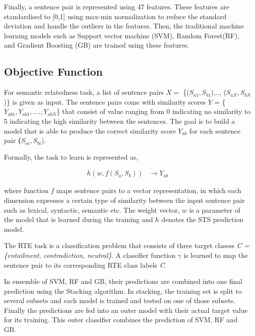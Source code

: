 \documentclass[12pt]{report} %
\begin{document}
	Finally, a sentence pair is represented using 47 features. These features are standardised to [0,1] using max-min normalization to reduce the standard deviation and handle the outliers in the features. Then, the traditional machine learning models such as Support vector machine (SVM), Random Forest(RF), and Gradient Boosting (GB) are trained using these features.
	
	\subsection{Objective Function}  
	
	For semantic relatedness task, a list of sentence pairs $X =$ \{($S_{a1},S_{b1}$),.., ($S_{aN},S_{bN}$)\} is given as input. The sentence pairs come with similarity scores $Y$ = \{$Y_{ab1}, Y_{ab1},...., Y_{abN}$\} that consist of value ranging from 0 indicating no similarity to 5 indicating the high similarity between the sentences. The goal is to build a model that is able to produce the correct similarity score $Y_{ab}$ for each sentence pair \textbf($S_{ai},S_{bi}$).
	
	Formally, the task to learn is represented as,
	
	\begin{align} 
	h(w,f(S_a,S_b))  & \rightarrow Y_{ab} 
	\end{align}
	
	where function $f$ maps sentence pairs to a vector
	representation, in which each dimension expresses a certain type of
	similarity between the input sentence pair such as lexical, syntactic, semantic etc. The weight vector,
	$w$ is a parameter of the model that is learned during the training and $h$ denotes the STS prediction model.
	
	The RTE task is a classification problem that consists of three target clasess  \textit{ C =\{entailment, contradiction, neutral\}}. A classifier function $\gamma$ is learned to map the sentence pair to its corresponding RTE class labels \textit{C}.
	
	In ensemble of SVM, RF and GB, their predictions are combined into one final prediction using the Stacking algorithm. In stacking, the training set is split to several subsets and each model is trained and tested on one of those subsets. Finally the predictions are fed into an outer model with their actual target value for its training. This outer classifier combines the prediction of SVM, RF and GB.
	
	
\end{document}
